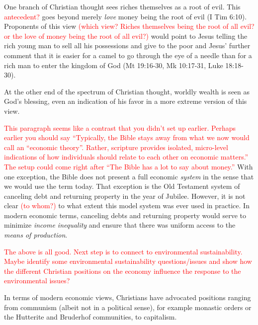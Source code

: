 \documentclass[12pt]{article}
\newcommand{\ins}[1]{\textcolor{red}{#1}}
\begin{document}
One branch of Christian thought sees riches themselves as a root of evil. 
This \ins{antecedent?} goes beyond
merely \emph{love} money being the root of evil (I Tim 6:10). Proponents of this view
\ins{(which view? Riches themselves being the root of all evil?
or the love of money being the root of all evil?)}
would point to Jesus telling the rich young man to sell all his possessions and give to
the poor and Jesus' further comment that it is easier for a camel to go through the eye of
a needle than for a rich man to enter the kingdom of God (Mt 19:16-30, Mk 10:17-31, Luke
18:18-30).

At the other end of the spectrum of Christian thought, worldly wealth is seen as God's
blessing, even an indication of his favor in a more extreme version of this view.

\ins{This paragraph seems like a contrast that you didn't set up earlier. 
Perhaps earlier you should say ``Typically, the Bible stays away from 
what we now would call an ``economic theory''. 
Rather, scripture provides isolated, micro-level indications of how individuals
should relate to each other on economic matters.''
The setup could come right after ``The Bible has a lot to say about money.''}
With one exception, the Bible does not present a full economic \emph{system} 
in the sense that we would use the term today.
That exception is the Old Testament system of canceling debt and returning property in the
year of Jubilee. However, it is not clear \ins{(to whom?)} 
to what extent this model system was ever used in practice.
In modern economic terms, canceling debts and returning property would serve to minimize 
\emph{income inequality} and ensure that there was uniform access to the \emph{means of production}.

\ins{The above is all good. 
Next step is to connect to environmental sustainability.
Maybe identify some environmental sustainability questions/issues
and show how the different Christian positions on the economy
influence the response to the environmental issues?}

In terms of modern economic views, Christians have advocated positions ranging from
communism (albeit not in a political sense), for example monastic orders or the Hutterite
and Bruderhof communities, to capitalism.
\end{document}
